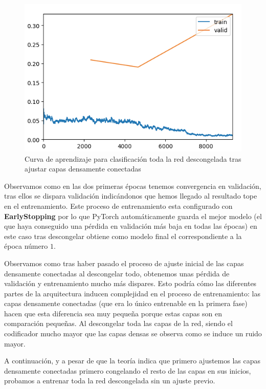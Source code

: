 \begin{figure}[H]
	\centering
	\includegraphics[width=0.7\linewidth]{imagenes/task1_unfreeze.png}
	\caption{Curva de aprendizaje para clasificación toda la red descongelada tras ajustar capas densamente conectadas}
\end{figure}

Observamos como en las dos primeras épocas tenemos convergencia en validación, tras ellos se dispara validación indicándonos que hemos llegado al resultado tope en el entrenamiento. Este proceso de entrenamiento esta configurado con \textbf{EarlyStopping} por lo que PyTorch automáticamente guarda el mejor modelo (el que haya conseguido una pérdida en validación más baja en todas las épocas) en este caso tras descongelar obtiene como modelo final el correspondiente a la época número $1$. 

Observamos como tras haber pasado el proceso de ajuste inicial de las capas densamente conectadas al descongelar todo, obtenemos unas pérdida de validación y entrenamiento mucho más dispares. Esto podría cómo las diferentes partes de la arquitectura inducen complejidad en el proceso de entrenamiento: las capas densamente conectadas (que era lo único entrenable en la primera fase) hacen que esta diferencia sea muy pequeña porque estas capas son en comparación pequeñas. Al descongelar toda las capas de la red, siendo el codificador mucho mayor que las capas densas se observa como se induce un ruido mayor.


A continuación, y a pesar de que la teoría indica que primero ajustemos las capas densamente conectadas primero congelando el resto de las capas en sus inicios, probamos a entrenar toda la red descongelada sin un ajuste previo.

